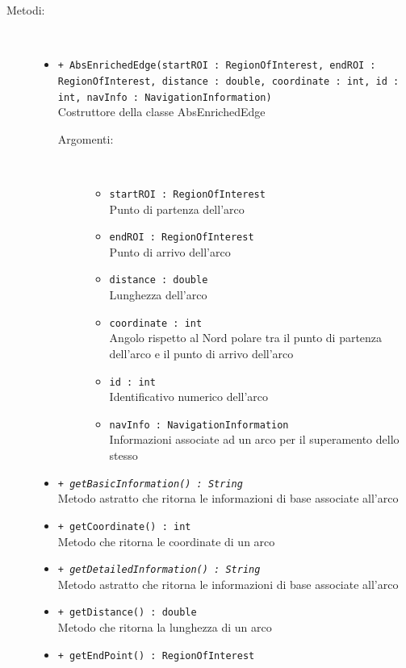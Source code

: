 \documentclass[../DefinizioneDiProdotto.tex]{subfiles}
\begin{document}
\begin{description}
\begin{itemize}
\end{itemize}
\item[Metodi:] \
\begin{itemize}
\item \texttt{+ AbsEnrichedEdge(startROI : RegionOfInterest, endROI : RegionOfInterest, distance : double, coordinate : int, id : int, navInfo : NavigationInformation)}\\
Costruttore della classe AbsEnrichedEdge
 \begin{description}
\item[Argomenti:] \
\begin{itemize}
\item \texttt{startROI : RegionOfInterest}\\
Punto di partenza dell'arco\item \texttt{endROI : RegionOfInterest}\\
Punto di arrivo dell'arco\item \texttt{distance : double}\\
Lunghezza dell'arco\item \texttt{coordinate : int}\\
Angolo rispetto al Nord polare tra il punto di partenza dell'arco e il punto di arrivo dell'arco\item \texttt{id : int}\\
Identificativo numerico dell'arco\item \texttt{navInfo : NavigationInformation}\\
Informazioni associate ad un arco per il superamento dello stesso\end{itemize}
\end{description}
\item \texttt{+ \textit{getBasicInformation() : String}}\\
Metodo astratto che ritorna le informazioni di base associate all'arco
 \item \texttt{+ getCoordinate() : int}\\
Metodo che ritorna le coordinate di un arco
 \item \texttt{+ \textit{getDetailedInformation() : String}}\\
Metodo astratto che ritorna le informazioni di base associate all'arco
 \item \texttt{+ getDistance() : double}\\
Metodo che ritorna la lunghezza di un arco
 \item \texttt{+ getEndPoint() : RegionOfInterest}\\

\end{itemize}
\end{description}
\end{document}
